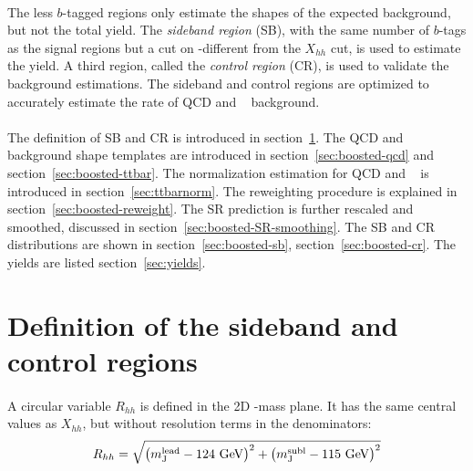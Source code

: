 \paragraph{}
The less $b$-tagged regions only estimate the shapes of the expected background, but not the total yield.
The \textit{sideband region} (SB), with the same number of $b$-tags as the signal regions but a cut on \mleadJ-\msublJ different from the $X_{hh}$ cut, is used to estimate the yield.
A third region, called the \textit{control region} (CR), is used to validate the background estimations.
The sideband and control regions are optimized to accurately estimate the rate of QCD and \ttbar~ background. 

\paragraph{}
The definition of SB and CR is introduced in section~\ref{sec:boosted-SBCR}.
The QCD and \ttbar~ background shape templates are introduced in section~\ref{sec:boosted-qcd} and section~\ref{sec:boosted-ttbar}.
The normalization estimation for QCD and \ttbar~ is introduced in section~\ref{sec:ttbarnorm}.
The reweighting procedure is explained in section~\ref{sec:boosted-reweight}.
The SR prediction is further rescaled and smoothed, discussed in section~\ref{sec:boosted-SR-smoothing}.
The SB and CR distributions are shown in section~\ref{sec:boosted-sb}, section~\ref{sec:boosted-cr}. 
The yields are listed section~\ref{sec:yields}.


\section{Definition of the sideband and control regions}
\label{sec:boosted-SBCR}

\paragraph{}
A circular variable $R_{hh}$ is defined in the 2D \mleadJ-\msublJ mass plane. 
It has the same central values as $X_{hh}$, but without resolution terms in the denominators:
\begin{equation}
\label{eq:boosted_RhhDef}
R_{hh} = \sqrt{\left(m^{\rm lead}_{\rm J} - \text{124 GeV}\right)^2 + \left(m^{\rm subl}_{\rm J} - \text{115 GeV}\right)^2}
\end{equation}

